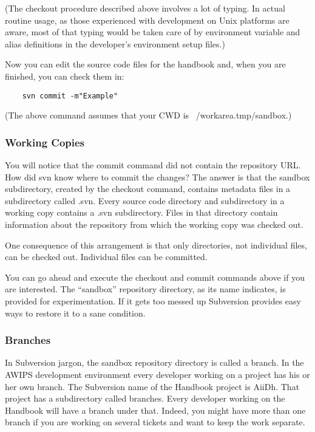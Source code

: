 (The checkout procedure
described above involves a lot of typing.  In actual
routine usage, as those experienced with development on
Unix platforms are aware, most of that typing would be
taken care of by environment variable and alias
definitions in the developer's environment setup files.)

Now you can edit the source code files for the handbook and,
when you are finished, you can check them in:
\begin{verbatim}
    svn commit -m"Example"
\end{verbatim}
(The above command assumes that your CWD is
~/workarea.tmp/sandbox.)


\subsubsection{Working Copies}

You will notice that the commit command did not contain
the repository URL.  How did svn know where to commit the
changes?  The answer is that the sandbox subdirectory,
created by the checkout command, contains metadata files
in a subdirectory called .svn.  Every source code directory
and subdirectory in a working copy contains a .svn
subdirectory.  Files in that directory contain 
information about the repository from which
the working copy was checked out.

One consequence of this arrangement is that only
directories, not individual files, can be checked out.
Individual files can be committed.

You can go ahead and execute the checkout and commit commands
above if you are interested.  The ``sandbox'' repository
directory, as its name indicates, is provided for
experimentation.  If it gets too messed up Subversion 
provides easy ways to restore it to a sane condition.

\subsubsection{Branches}
In Subversion jargon, the sandbox repository directory is 
called a branch.  In the AWIPS development environment
every developer working on a project has his or her
own branch.  The Subversion name of the Handbook project
is AiiDh.  That project has a subdirectory called branches.
Every developer working on the Handbook will have
a branch under that.  Indeed, you
might have more than one branch if you are working on
several tickets and want to keep the work separate.

